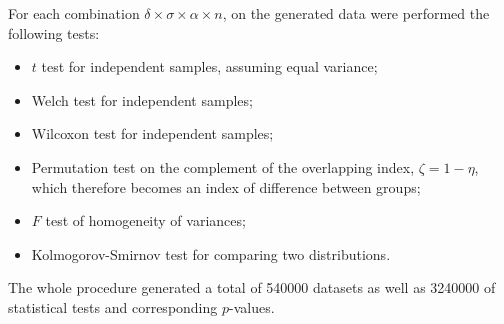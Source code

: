 \documentclass[twocolumn]{article}\usepackage[]{graphicx}\usepackage[]{xcolor}
\begin{document}
For each combination $\delta \times \sigma \times \alpha \times n $, on the generated data were performed the following tests: 
\begin{itemize}
 \item $t$ test for independent samples, assuming equal variance;
 \item Welch test for independent samples;
 \item Wilcoxon test for independent samples;
 \item Permutation test on the complement of the overlapping index, $\zeta = 1-\eta$, which therefore becomes an index of difference between groups;
 \item $F$ test of homogeneity of variances;
 \item Kolmogorov-Smirnov test for comparing two distributions.
\end{itemize}

The whole procedure generated a total of 540000 datasets as well as 3240000 of statistical tests and corresponding $p$-values.

\end{document}
